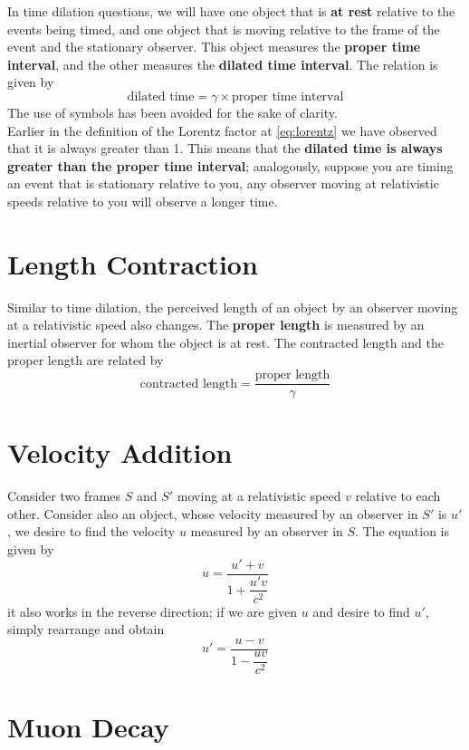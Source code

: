 \documentclass[a4paper,12pt]{article}
\let\oldsection\section
\renewcommand\section{\clearpage\oldsection}
\newcommand{\lb}{\\[8pt]}
\begin{document}
In time dilation questions, we will have one object that is \textbf{at rest} relative to the events being timed, and one object that is moving relative to the frame of the event and the stationary observer. This object measures the \textbf{proper time interval}, and the other measures the \textbf{dilated time interval}. The relation is given by
\begin{equation}
  \text{dilated time} = \gamma \times \text{proper time interval}
\end{equation}
The use of symbols has been avoided for the sake of clarity.\lb
Earlier in the definition of the Lorentz factor at \cref{eq:lorentz} we have observed that it is always greater than 1. This means that the \textbf{dilated time is always greater than the proper time interval}; analogously, suppose you are timing an event that is stationary relative to you, any observer moving at relativistic speeds relative to you will observe a longer time.


\section{Length Contraction}

Similar to time dilation, the perceived length of an object by an observer moving at a relativistic speed also changes. The \textbf{proper length} is measured by an inertial observer for whom the object is at rest. The contracted length and the proper length are related by
\begin{equation}
  \text{contracted length} = \frac{\text{proper length}}{\gamma}
\end{equation}

\section{Velocity Addition}

Consider two frames $S$ and $S'$ moving at a relativistic speed $v$ relative to each other. Consider also an object, whose velocity measured by an observer in $S'$ is $u'$, we desire to find the velocity $u$ measured by an observer in $S$. The equation is given by
$$u = \frac{u' + v}{1 + \dfrac{u'v}{c^2}}$$
it also works in the reverse direction; if we are given $u$ and desire to find $u'$, simply rearrange and obtain
$$u' = \frac{u - v}{1 - \dfrac{uv}{c^2}}$$

\section{Muon Decay}
\end{document}
